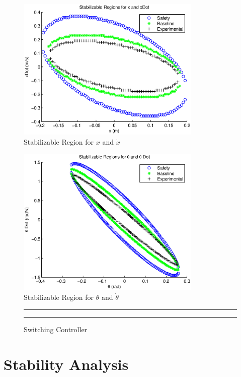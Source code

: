 \documentclass[conference]{IEEEtran}
\begin{document}
\begin{figure}[htp]
\centering
\includegraphics[width=250pt]{stabRegionX}
\caption{Stabilizable Region for $x$ and $\dot{x}$}\label{fig:stabRegionX}
\end{figure}

\begin{figure}[htp]
\centering
\includegraphics[width=250pt]{stabRegionTheta}
\caption{Stabilizable Region for $\theta$ and $\dot{\theta}$}\label{fig:stabRegionTheta}
\end{figure}

\begin{figure}[h!]
\centering
  \hrule
	{}
  \hrule
  \caption{Switching Controller}
  \label{fig:switchingController}
\end{figure}

\section{Stability Analysis}
\end{document}
